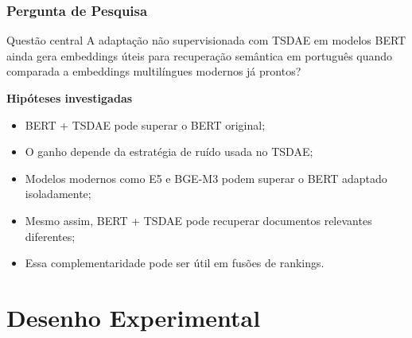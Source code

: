 \documentclass[aspectratio=169]{beamer}
\begin{document}
\begin{frame}
\frametitle{Pergunta de Pesquisa}

\begin{alertblock}{Questão central}
A adaptação não supervisionada com TSDAE em modelos BERT ainda gera embeddings úteis para recuperação semântica em português quando comparada a embeddings multilíngues modernos já prontos?
\end{alertblock}

\vspace{0.3cm}

\textbf{Hipóteses investigadas}

\begin{itemize}
  \item BERT + TSDAE pode superar o BERT original;
  \item O ganho depende da estratégia de ruído usada no TSDAE;
  \item Modelos modernos como E5 e BGE-M3 podem superar o BERT adaptado isoladamente;
  \item Mesmo assim, BERT + TSDAE pode recuperar documentos relevantes diferentes;
  \item Essa complementaridade pode ser útil em fusões de rankings.
\end{itemize}

\end{frame}

\section{Desenho Experimental}
\end{document}
